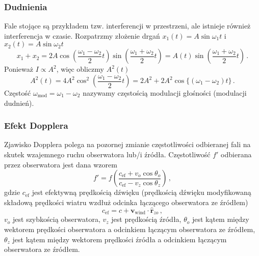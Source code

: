\documentclass[../main.tex]{subfiles}
\begin{document}
        \subsubsection{Dudnienia}
        Fale stojące są przykładem tzw. interferencji w przestrzeni, ale istnieje również interferencja w czasie. Rozpatrzmy złożenie drgań \(x_1(t)=A\sin\omega_1t\) i \(x_2(t)=A\sin\omega_2t\)
        \begin{equation*}
            x_1+x_2=2A\cos\left(\frac{\omega_1-\omega_2}{2}t\right)\sin\left(\frac{\omega_1+\omega_2}{2}t\right)=A(t)\sin\left(\frac{\omega_1+\omega_2}{2}t\right)\,.
        \end{equation*}
        Ponieważ \(I\propto A^2\), więc obliczmy \(A^2(t)\)
        \begin{equation*}
            A^2(t)=4A^2\cos^2\left(\frac{\omega_1-\omega_2}{2}t\right)=2A^2+2A^2\cos\{(\omega_1-\omega_2)t\}\,.
        \end{equation*}
        Częstość \(\omega_\text{mod}=\omega_1-\omega_2\) nazywamy częstością modulacji głośności (modulacji dudnień).
        
        \subsubsection{Efekt Dopplera}
        Zjawisko Dopplera polega na pozornej zmianie częstotliwości odbieranej fali na skutek wzajemnego ruchu obserwatora lub/i źródła. Częstotliwość \(f'\) odbierana przez obserwatora jest dana wzorem
        \begin{equation*}
            f'=f\left(\frac{c_\text{ef}+ v_o\cos\theta_o}{c_\text{ef}- v_z\cos\theta_z}\right)\,,
        \end{equation*}
        gdzie \(c_\text{ef}\) jest efektywną prędkością dźwięku (prędkością dźwięku modyfikowaną składową prędkości wiatru wzdłuż odcinka łączącego obserwatora ze źródłem)
        \begin{equation*}
            c_\text{ef}=c+\mathbf{v}_\text{wind}\cdot \mathbf{\hat r}_{zo}\,,
        \end{equation*}
        \(v_o\) jest szybkością obserwatora, \(v_z\) jest prędkością źródła, \(\theta_o\) jest kątem między wektorem prędkości obserwatora a odcinkiem łączącym obserwatora ze źródłem, \(\theta_z\) jest kątem między wektorem prędkości źródła a odcinkiem łączącym obserwatora ze źródłem.
        
\end{document}
